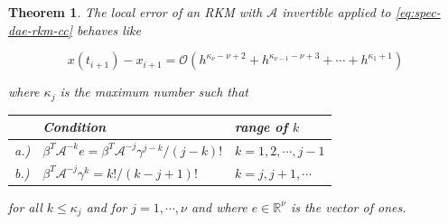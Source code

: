 \documentclass[]{book}
\newtheorem{theorem}{Theorem}[chapter]
\theoremstyle{definition}
\theoremstyle{definition}
\theoremstyle{definition}
\theoremstyle{definition}
\theoremstyle{remark}
\begin{document}
\begin{theorem}
\protect\hypertarget{thm:local-consistency-error-rkm-lcc}{}{\label{thm:local-consistency-error-rkm-lcc} }The local error of an RKM with \(\mathcal A\) invertible applied to \eqref{eq:spec-dae-rkm-cc} behaves like

\[
x(t_{i+1}) - x_{i+1} = \mathcal O(h^{\kappa_\nu - \nu + 2} + h^{\kappa_{\nu-1} - \nu + 3} + \cdots + h^{\kappa_1 +1})
\]

where \(\kappa_j\) is the maximum number such that

\begin{longtable}[]{@{}lll@{}}
\toprule
\begin{minipage}[b]{0.07\columnwidth}\raggedright
\strut
\end{minipage} & \begin{minipage}[b]{0.53\columnwidth}\raggedright
Condition\strut
\end{minipage} & \begin{minipage}[b]{0.31\columnwidth}\raggedright
range of \(k\)\strut
\end{minipage}\tabularnewline
\midrule
\endhead
\begin{minipage}[t]{0.07\columnwidth}\raggedright
a.)\strut
\end{minipage} & \begin{minipage}[t]{0.53\columnwidth}\raggedright
\(\beta^T\mathcal A^{-k}e = \beta^T\mathcal A^{-j}\gamma^{j-k} / (j-k)!\)\strut
\end{minipage} & \begin{minipage}[t]{0.31\columnwidth}\raggedright
\(k=1,2,\cdots,j-1\)\strut
\end{minipage}\tabularnewline
\begin{minipage}[t]{0.07\columnwidth}\raggedright
b.)\strut
\end{minipage} & \begin{minipage}[t]{0.53\columnwidth}\raggedright
\(\beta^T\mathcal A^{-j}\gamma^k = k! / (k-j+1)!\)\strut
\end{minipage} & \begin{minipage}[t]{0.31\columnwidth}\raggedright
\(k=j,j+1,\cdots\)\strut
\end{minipage}\tabularnewline
\bottomrule
\end{longtable}

for all \(k\leq \kappa_j\) and for \(j=1, \cdots, \nu\) and where \(e\in \mathbb R^{\nu}\) is the vector of ones.
\end{theorem}
\end{document}
